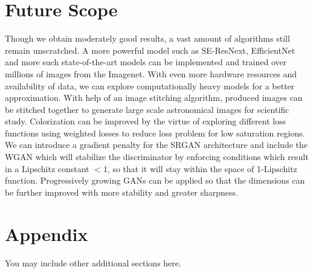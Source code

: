 \documentclass{article} %
\begin{document}
    \section{Future Scope}
    \hspace*{0.25 in}Though we obtain moderately good results, a vast amount of algorithms still remain unscratched. A more powerful model such as SE-ResNext, EfficientNet and more such state-of-the-art models can be implemented and trained over millions of images from the Imagenet. With even more hardware resources and availability of data, we can explore computationally heavy models for a better approximation. With help of an image stitching algorithm, produced images can be stitched together to generate large scale astronomical images for scientific study. Colorization can be improved by the virtue of exploring different loss functions using weighted losses to reduce loss problem for low saturation regions. We can introduce a gradient penalty for the SRGAN architecture and include the WGAN \citep{arjovsky2017wasserstein} which will stabilize the discriminator by enforcing conditions which result in a Lipschitz constant $<1$, so that it will stay within the space of 1-Lipschitz function. Progressively growing GANs \citep{karras2018progressive} can be applied so that the dimensions can be further improved with more stability and greater sharpness.




\appendix
\section{Appendix}
You may include other additional sections here.
\end{document}
